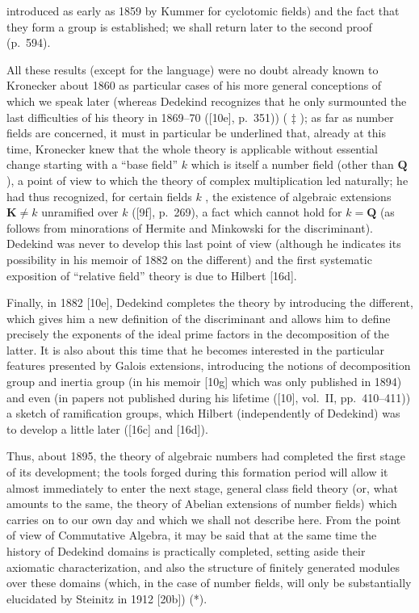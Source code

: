 introduced as early as 1859 by Kummer for cyclotomic fields) and the fact that they form a group is established; we shall return later to the second proof (p.~594).

All these results (except for the language) were no doubt already known to Kronecker about 1860 as particular cases of his more general conceptions of which we speak later (whereas Dedekind recognizes that he only surmounted the last difficulties of his theory in 1869--70 ({[}10e{]}, p.~351)) ( \(\ddagger\) ); as far as number fields are concerned, it must in particular be underlined that, already at this time, Kronecker knew that the whole theory is applicable without essential change starting with a ``base field'' \(k\) which is itself a number field (other than \(\mathbf{Q}\) ), a point of view to which the theory of complex multiplication led naturally; he had thus recognized, for certain fields \(k\) , the existence of algebraic extensions \(\mathbf{K} \neq k\) unramified over \(k\) ({[}9f{]}, p.~269), a fact which cannot hold for \(k = \mathbf{Q}\) (as follows from minorations of Hermite and Minkowski for the discriminant). Dedekind was never to develop this last point of view (although he indicates its possibility in his memoir of 1882 on the different) and the first systematic exposition of ``relative field'' theory is due to Hilbert {[}16d{]}.

Finally, in 1882 {[}10e{]}, Dedekind completes the theory by introducing the different, which gives him a new definition of the discriminant and allows him to define precisely the exponents of the ideal prime factors in the decomposition of the latter. It is also about this time that he becomes interested in the particular features presented by Galois extensions, introducing the notions of decomposition group and inertia group (in his memoir {[}10g{]} which was only published in 1894) and even (in papers not published during his lifetime ({[}10{]}, vol.~II, pp.~410--411)) a sketch of ramification groups, which Hilbert (independently of Dedekind) was to develop a little later ({[}16c{]} and {[}16d{]}).

Thus, about 1895, the theory of algebraic numbers had completed the first stage of its development; the tools forged during this formation period will allow it almost immediately to enter the next stage, general class field theory (or, what amounts to the same, the theory of Abelian extensions of number fields) which carries on to our own day and which we shall not describe here. From the point of view of Commutative Algebra, it may be said that at the same time the history of Dedekind domains is practically completed, setting aside their axiomatic characterization, and also the structure of finitely generated modules over these domains (which, in the case of number fields, will only be substantially elucidated by Steinitz in 1912 {[}20b{]}) (*).

